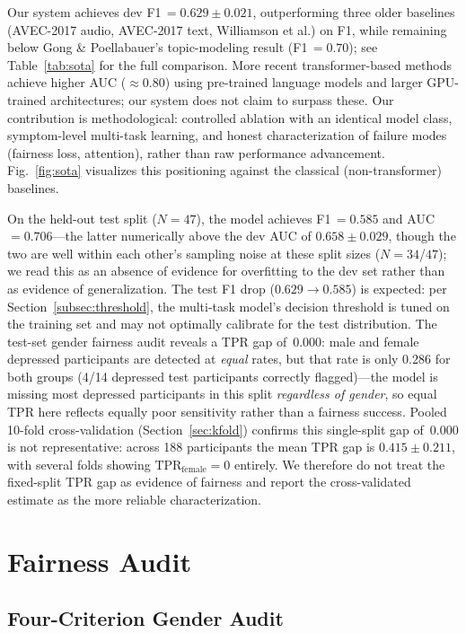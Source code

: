 \documentclass[journal]{IEEEtran}
\begin{document}
Our system achieves dev F1\,$=0.629\pm0.021$, outperforming three older
baselines (AVEC-2017 audio, AVEC-2017 text, Williamson et al.) on F1,
while remaining below Gong \& Poellabauer's topic-modeling result
(F1\,$=0.70$); see Table~\ref{tab:sota} for the full comparison.
More recent transformer-based methods \cite{ray2019} achieve
higher AUC ($\approx$0.80) using pre-trained language models and larger
GPU-trained architectures; our system does not claim to surpass these.
Our contribution is methodological: controlled ablation with an
identical model class, symptom-level multi-task learning, and honest
characterization of failure modes (fairness loss, attention), rather
than raw performance advancement. Fig.~\ref{fig:sota} visualizes this
positioning against the classical (non-transformer) baselines.

On the held-out test split ($N{=}47$), the model achieves
F1\,$=0.585$ and AUC\,$=0.706$---the latter numerically
above the dev AUC of $0.658\pm0.029$, though the two are well within
each other's sampling noise at these split sizes ($N{=}34$/$47$); we
read this as an absence of evidence for overfitting to the dev set
rather than as evidence of generalization. The test F1 drop ($0.629\to0.585$) is
expected: per Section~\ref{subsec:threshold}, the multi-task model's
decision threshold is tuned on the training set and may not
optimally calibrate for the test distribution. The test-set gender
fairness audit reveals a TPR gap of~0.000: male and female depressed
participants are detected at \emph{equal} rates, but that rate is only
$0.286$ for both groups (4/14 depressed test participants correctly
flagged)---the model is missing most depressed participants in this
split \emph{regardless of gender}, so equal TPR here reflects equally
poor sensitivity rather than a fairness success. Pooled 10-fold
cross-validation (Section~\ref{sec:kfold}) confirms this single-split
gap of~0.000 is not representative: across 188 participants the mean
TPR gap is $0.415\pm0.211$, with several folds showing $\text{TPR}_\text{female}=0$
entirely. We therefore do not treat the fixed-split TPR gap as
evidence of fairness and report the cross-validated estimate as the
more reliable characterization.

\section{Fairness Audit}
\label{sec:fairness}

\subsection{Four-Criterion Gender Audit}
\end{document}
